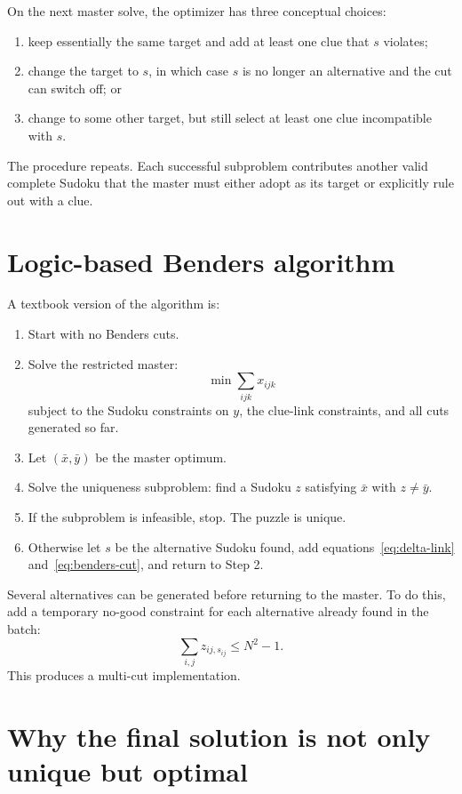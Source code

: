\documentclass[11pt]{article}
\begin{document}
On the next master solve, the optimizer has three conceptual choices:
\begin{enumerate}
    \item keep essentially the same target and add at least one clue that $s$ violates;
    \item change the target to $s$, in which case $s$ is no longer an alternative and the cut can switch off; or
    \item change to some other target, but still select at least one clue incompatible with $s$.
\end{enumerate}

The procedure repeats. Each successful subproblem contributes another valid complete Sudoku that the master must either adopt as its target or explicitly rule out with a clue.

\section{Logic-based Benders algorithm}

A textbook version of the algorithm is:

\begin{enumerate}
    \item Start with no Benders cuts.
    \item Solve the restricted master:
    \[
    \min \sum_{ijk}x_{ijk}
    \]
    subject to the Sudoku constraints on $y$, the clue-link constraints, and all cuts generated so far.
    \item Let $(\bar x,\bar y)$ be the master optimum.
    \item Solve the uniqueness subproblem: find a Sudoku $z$ satisfying $\bar x$ with $z\neq\bar y$.
    \item If the subproblem is infeasible, stop. The puzzle is unique.
    \item Otherwise let $s$ be the alternative Sudoku found, add equations~\eqref{eq:delta-link} and~\eqref{eq:benders-cut}, and return to Step 2.
\end{enumerate}

Several alternatives can be generated before returning to the master. To do this, add a temporary no-good constraint for each alternative already found in the batch:
\begin{equation}
\sum_{i,j} z_{ij,s_{ij}}\le N^2-1.
\end{equation}
This produces a multi-cut implementation.

\section{Why the final solution is not only unique but optimal}
\end{document}
